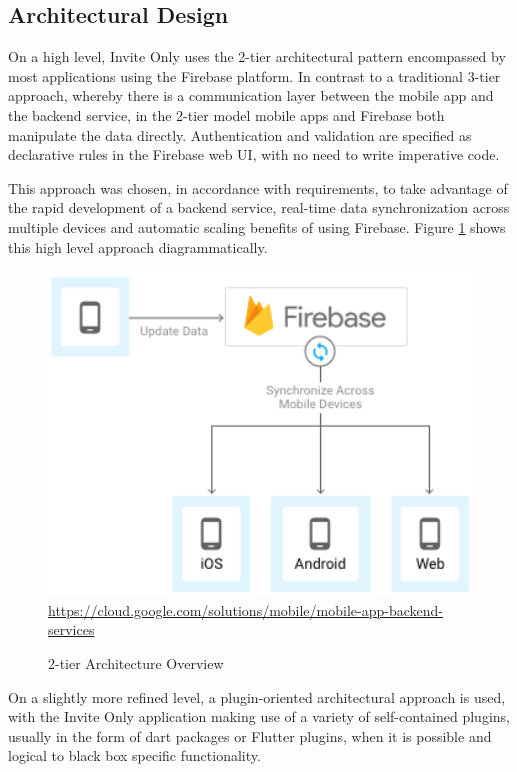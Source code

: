 \newpage

\subsection{Architectural Design}

On a high level, Invite Only uses the 2-tier architectural pattern encompassed by most applications using the Firebase platform. In contrast to a traditional 3-tier approach, whereby there is a communication layer between the mobile app and the backend service, in the 2-tier model mobile apps and Firebase both manipulate the data directly. Authentication and validation are specified as declarative rules in the Firebase web UI, with no need to write imperative code.

This approach was chosen, in accordance with requirements, to take advantage of the rapid development of a backend service, real-time data synchronization across multiple devices and automatic scaling benefits of using Firebase. Figure \ref{fig:overview_firebase} shows this high level approach diagrammatically.

\begin{figure}[H]
  \centering
  \includegraphics[width=1.0\textwidth]{documentation/software_requirements_specification/architecture/overview_firebase.png}
    \footnotesize \url{https://cloud.google.com/solutions/mobile/mobile-app-backend-services}
  \caption{2-tier Architecture Overview}
  \label{fig:overview_firebase}
\end{figure}

On a slightly more refined level, a plugin-oriented architectural approach is used, with the Invite Only application making use of a variety of self-contained plugins, usually in the form of dart packages or Flutter plugins, when it is possible and logical to black box specific functionality.


